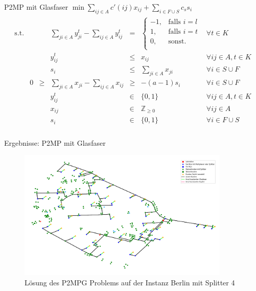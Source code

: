 \documentclass{beamer}
\newcommand{\Z}{\mathbb{Z}}
\begin{document}
	\begin{frame}{P2MP mit Glasfaser}
	 $\min \displaystyle\sum_{ij \in A} c'(ij) x_{ij} + \displaystyle\sum_{i \in F \cup S} c_s s_i $
	\begin{align*}
\begin{array}{rcrcrcl}
\textrm{s.t.}  
&& &\displaystyle\sum_{ji \in A} y_{ji}^t - \displaystyle\sum_{ij \in A} y_{ij}^t& = & \left\{\begin{array}{cl} 
-1, & \text{falls } i=l\\ 
1, & \text{falls } i=t\\ 
0, & \text{sonst.}\\ 
\end{array}
\right. & \forall t \in K\\
&&& y_{ij}^t & \leq & x_{ij} & \forall ij \in A, t\in K \\
&&& s_i &\leq& \displaystyle\sum_{ji \in A} x_{ji}& \forall  i \in S \cup F\\ 
&0&\geq&\displaystyle\sum_{ji \in A} x_{ji} - \displaystyle\sum_{ij \in A} x_{ij}&\geq& -(a-1)s_i & \forall i \in S \cup F\\
&&& y_{ij}^t & \in & \{0,1 \}& \forall ij \in A, t \in K \\
&&& x_{ij} & \in & \Z_{\geq 0} & \forall ij \in A\\
&&& s_i & \in & \{ 0,1 \} & \forall i \in F \cup S \\
\end{array}
\end{align*}
\end{frame}

\begin{frame}{Ergebnisse: P2MP mit Glasfaser}
	\begin{figure}[!htbp]
	 \centering
				\includegraphics[width=0.9\textwidth]{./Bilder/P2MPG_Berlin_demand1_duration0}
				\caption{Lösung des P2MPG Problems auf der Instanz Berlin mit Splitter 4}
				\label{p2mpg_b_pic}
	\end{figure}
\end{frame}
\end{document}
